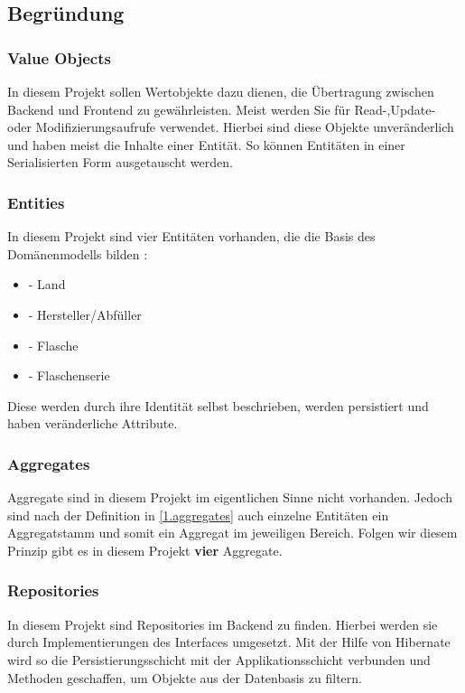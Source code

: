 		\subsection{Begründung}
		
			\subsubsection{Value Objects}
			In diesem Projekt sollen Wertobjekte dazu dienen, die Übertragung zwischen Backend und Frontend zu gewährleisten. Meist werden Sie für Read-,Update- oder Modifizierungsaufrufe verwendet. Hierbei sind diese  Objekte unveränderlich und haben meist die Inhalte einer Entität. So können Entitäten in einer Serialisierten Form ausgetauscht werden.
			
			\subsubsection{Entities}
			In diesem Projekt sind vier Entitäten vorhanden, die die Basis des Domänenmodells bilden :
			\begin{itemize}
				\item {} - Land
				\item {} - Hersteller/Abfüller
				\item {} - Flasche
				\item {} - Flaschenserie
			\end{itemize}
			Diese werden durch ihre Identität selbst beschrieben, werden persistiert und haben veränderliche Attribute.
			
			\subsubsection{Aggregates}
			Aggregate sind in diesem Projekt im eigentlichen Sinne nicht vorhanden. Jedoch sind nach der Definition in \cref{1.aggregates} auch einzelne Entitäten ein Aggregatstamm und somit ein Aggregat im jeweiligen Bereich. Folgen wir diesem Prinzip gibt es in diesem Projekt \textbf{vier} Aggregate.
			
			\subsubsection{Repositories}
			In diesem Projekt sind Repositories im Backend zu finden. Hierbei werden sie durch Implementierungen des Interfaces  umgesetzt. Mit der Hilfe von Hibernate wird so die Persistierungsschicht mit der Applikationsschicht verbunden und Methoden geschaffen, um Objekte aus der Datenbasis zu filtern.
			
